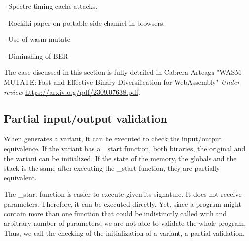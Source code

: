 






- Spectre timing cache attacks.

- Rockiki paper on portable side channel in browsers.



- Use of wasm-mutate


- Diminshing of BER


\begin{tcolorbox}[title=Contribution paper,boxrule=1pt,arc=.2em,boxsep=1.0mm]
    The case discussed in this section is fully detailed in Cabrera-Arteaga \etal "WASM-MUTATE: Fast and Effective Binary Diversification for WebAssembly"
    \emph{Under review}
    \url{https://arxiv.org/pdf/2309.07638.pdf}. 
\end{tcolorbox}





\subsection{Partial input/output validation}

When \tool generates a variant, it can be executed to check the input/output equivalence.
If the variant has a \_start function, both binaries, the original and the variant can be initialized. 
If the state of the memory, the globals and the stack is the same after executing the \_start function, they are partially equivalent.

The \_start function is easier to execute given its signature.
It does not receive parameters.
Therefore, it can be executed directly.
Yet, since a \Wasm program might contain more than one function that could be indistinctly called with and arbitrary number of parameters, we are not able to validate the whole program.
Thus, we call the checking of the initialization of a \wasm variant, a partial validation.

